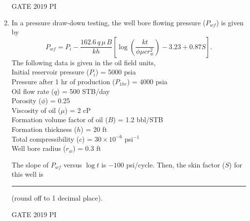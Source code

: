 \documentclass[journal,12pt,onecolumn]{IEEEtran}
\theoremstyle{remark}
\begin{document}
\begin{enumerate}
\hfill{GATE 2019 PI}
\item In a pressure draw-down testing, the well bore flowing pressure ($P_{wf}$) is given by
\[
P_{wf} = P_i - \frac{162.6\, q\, \mu\, B}{kh} \left[ \log\left( \frac{kt}{\phi \mu c r_w^2} \right) - 3.23 + 0.87 S \right].
\]
The following data is given in the oil field units, \\
Initial reservoir pressure ($P_i$) = 5000 psia \\
Pressure after 1 hr of production ($P_{1hr}$) = 4000 psia \\
Oil flow rate ($q$) = 500 STB/day \\
Porosity ($\phi$) = 0.25 \\
Viscosity of oil ($\mu$) = 2 cP \\
Formation volume factor of oil ($B$) = 1.2 bbl/STB \\
Formation thickness ($h$) = 20 ft \\
Total compressibility ($c$) = $30 \times 10^{-6}$ psi$^{-1}$ \\
Well bore radius ($r_w$) = 0.3 ft

The slope of $P_{wf}$ versus $\log t$ is $-100$ psi/cycle. Then, the skin factor ($S$) for this well is \rule{2cm}{0.15mm} (round off to 1 decimal place).

\hfill{GATE 2019 PI}

\end{enumerate}
\end{document}
